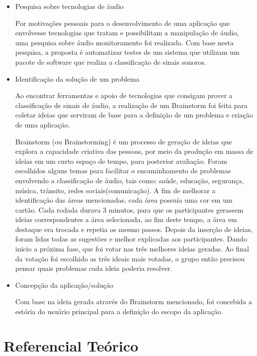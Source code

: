 \begin{itemize}
	\item Pesquisa sobre tecnologias de áudio
	
Por motivações pessoais para o desenvolvimento de uma aplicação que envolvesse tecnologias que tratam e possibilitam a manipulação de áudio, uma pesquisa sobre áudio monitoramento foi realizada.  Com base nesta pesquisa, a proposta é automatizar testes de um sistema que utilizam um pacote de software que realiza a classificação de sinais sonoros. 

	\item Identificação da solução de um problema	
	
Ao encontrar ferramentas e apoio de tecnologias que consigam prover a classificação de sinais de áudio,  a realização de um Brainstorm foi feita para coletar ideias que serviram de base para a definição de um problema e criação de uma aplicação.


Brainstorm (ou Brainstorming) é um processo de geração de ideias que explora a capacidade criativa das pessoas,  por meio da produção em massa de ideias em um curto espaço de tempo, para posterior avaliação.  Foram escolhidos alguns temas para facilitar o encaminhamento de problemas envolvendo a classificação de áudio, tais como: saúde, educação, segurança, música, trânsito, redes sociais(comunicação). A fim de melhorar a identificação das áreas mencionadas, cada área possuía uma cor em um cartão. Cada rodada durava 3 minutos, para que os participantes gerassem ideias correspondentes a área selecionada, ao fim deste tempo, a área em destaque era trocada e repetia os mesmo passos. Depois da inserção de ideias, foram lidas todas as sugestões e melhor explicadas aos participantes. Dando inicio a próxima fase, que foi votar nas três melhores ideias geradas. Ao final da votação foi escolhido as três ideais mais votadas, o grupo então precisou pensar quais problemas cada ideia poderia resolver. 
	
	\item Concepção da aplicação/solução
	
Com base na ideia gerada através do Brainstorm mencionado, foi concebida a estória do usuário principal para a definição do escopo da aplicação.
 
\end{itemize}

\section{Referencial Teórico}


